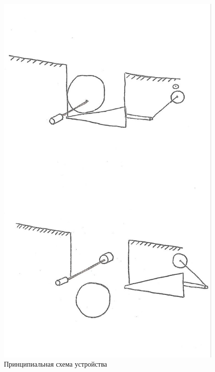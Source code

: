 \begin{figure}[H]
	\centering
	\includegraphics[width=12cm]{scheme_idea.jpg}
	\caption{Принципиальная схема устройства}
	\label{ris:scheme_idea}
\end{figure}
\par\medskip